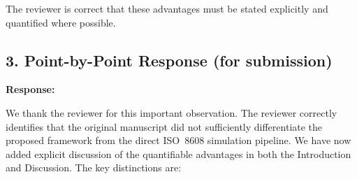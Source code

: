 \documentclass[11pt]{article}
\begin{document}
The reviewer is correct that these advantages must be stated explicitly and quantified where possible.

\subsection*{3. Point-by-Point Response (for submission)}

\noindent\textbf{Response:}

We thank the reviewer for this important observation. The reviewer correctly identifies that the original manuscript did not sufficiently differentiate the proposed framework from the direct ISO~8608 simulation pipeline. We have now added explicit discussion of the quantifiable advantages in both the Introduction and Discussion. The key distinctions are:
\end{document}
